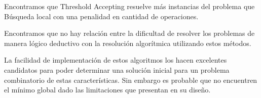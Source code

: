 \documentclass[a4paper,spanish]{article}
\begin{document}
Encontramos que Threshold Accepting resuelve más instancias del problema que
Búsqueda local con una penalidad en cantidad de operaciones.

Encontramos que no hay relación entre la dificultad de resolver los problemas de
manera lógico deductivo con la resolución algorítmica utilizando estos métodos.

La facilidad de implementación de estos algoritmos los hacen excelentes
candidatos para poder determinar una solución inicial para un problema
combinatorio de estas características. Sin embargo es probable que no encuentren
el mínimo global dado las limitaciones que presentan en su diseño.

\clearpage


\end{document}
